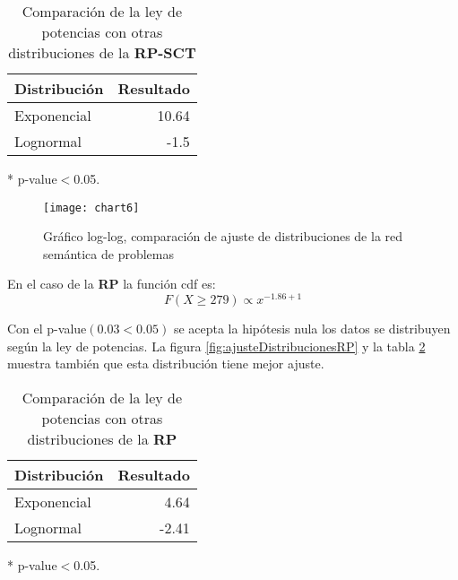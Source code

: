\begin{table}[htb]
\centering
\caption{Comparación de la ley de potencias con otras distribuciones de la \textbf{\acrshort{RP-SCT}}}
\label{distribucionRPSCT}
\begin{threeparttable}
\begin{tabular}{@{}lr@{}}
\toprule
Distribución & Resultado    \\ \midrule
Exponencial  & 10.64\tnote{*}  \\
Lognormal    & -1.5 \\ \bottomrule
\end{tabular}
\begin{tablenotes}
    \item[*] p-value$<$\num{0.05}.
  \end{tablenotes}
\end{threeparttable}
\end{table}

\begin{figure}[ht]
\caption{Gráfico log-log, comparación de ajuste de distribuciones de la red semántica de problemas}
\label{fig:ajusteDistribuciones}
\centering
\texttt{[image: chart6]}
\end{figure}

En el caso de la \textbf{\acrshort{RP}} la función \acrshort{cdf}  es:
\begin{equation}
F(X\geq 279) \propto x^{-1.86 +1}
\end{equation}

Con el p-value$(0.03<0.05)$ se acepta la hipótesis nula los datos se distribuyen según la ley de potencias. La figura \ref{fig:ajusteDistribucionesRP} y la tabla \ref{distribucionRP} muestra también que esta distribución tiene mejor ajuste.

\begin{table}[htb]
\centering
\caption{Comparación de la ley de potencias con otras distribuciones de la \textbf{\acrshort{RP}}}
\label{distribucionRP}
\begin{threeparttable}
\begin{tabular}{@{}lr@{}}
\toprule
Distribución & Resultado    \\ \midrule
Exponencial  & 4.64\tnote{*}  \\
Lognormal    & -2.41 \\ \bottomrule
\end{tabular}
\begin{tablenotes}
    \item[*] p-value$<$\num{0.05}.
  \end{tablenotes}
\end{threeparttable}
\end{table}

